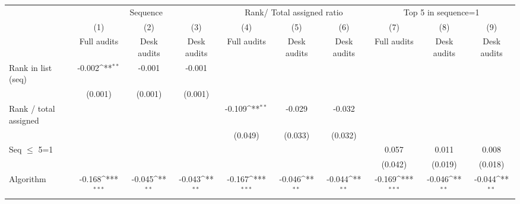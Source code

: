 {
\def\sym#1{\ifmmode^{#1}\else\(^{#1}\)\fi}
\begin{tabular}{l*{9}{c}}
\toprule
                &\multicolumn{3}{c}{Sequence}                            &\multicolumn{3}{c}{Rank/ Total assigned ratio}          &\multicolumn{3}{c}{Top 5 in sequence=1}                 \\\cmidrule(lr){2-4}\cmidrule(lr){5-7}\cmidrule(lr){8-10}
                &\multicolumn{1}{c}{(1)}&\multicolumn{1}{c}{(2)}&\multicolumn{1}{c}{(3)}&\multicolumn{1}{c}{(4)}&\multicolumn{1}{c}{(5)}&\multicolumn{1}{c}{(6)}&\multicolumn{1}{c}{(7)}&\multicolumn{1}{c}{(8)}&\multicolumn{1}{c}{(9)}\\
                &\multicolumn{1}{c}{Full audits}&\multicolumn{1}{c}{Desk audits}&\multicolumn{1}{c}{Desk audits}&\multicolumn{1}{c}{Full audits}&\multicolumn{1}{c}{Desk audits }&\multicolumn{1}{c}{Desk audits}&\multicolumn{1}{c}{Full audits}&\multicolumn{1}{c}{Desk audits }&\multicolumn{1}{c}{Desk audits}\\
\midrule
Rank in list (seq)&   -0.002\sym{**} &   -0.001         &   -0.001         &                  &                  &                  &                  &                  &                  \\
                &  (0.001)         &  (0.001)         &  (0.001)         &                  &                  &                  &                  &                  &                  \\
\addlinespace
Rank / total assigned&                  &                  &                  &   -0.109\sym{**} &   -0.029         &   -0.032         &                  &                  &                  \\
                &                  &                  &                  &  (0.049)         &  (0.033)         &  (0.032)         &                  &                  &                  \\
\addlinespace
Seq $\le$ 5=1   &                  &                  &                  &                  &                  &                  &    0.057         &    0.011         &    0.008         \\
                &                  &                  &                  &                  &                  &                  &  (0.042)         &  (0.019)         &  (0.018)         \\
\addlinespace
Algorithm       &   -0.168\sym{***}&   -0.045\sym{**} &   -0.043\sym{**} &   -0.167\sym{***}&   -0.046\sym{**} &   -0.044\sym{**} &   -0.169\sym{***}&   -0.046\sym{**} &   -0.044\sym{**} \\

\end{tabular}}
